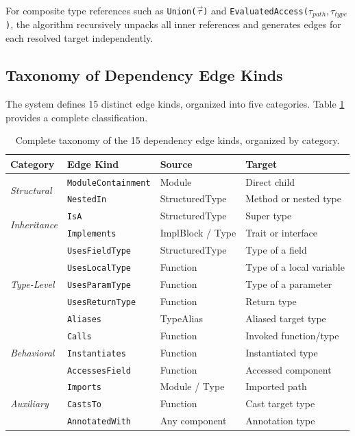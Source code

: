 For composite type references such as \texttt{Union($\vec{\tau}$)} and \texttt{EvaluatedAccess($\tau_{path}, \tau_{type}$)}, the algorithm recursively unpacks all inner references and generates edges for each resolved target independently.

\subsection{Taxonomy of Dependency Edge Kinds}

The system defines 15 distinct edge kinds, organized into five categories. Table \ref{tab:edge_taxonomy} provides a complete classification.

\begin{table}[htpb]
  \centering
  \small
  \begin{tabular}{|l|l|l|l|}
    \hline
    \textbf{Category} & \textbf{Edge Kind} & \textbf{Source} & \textbf{Target} \\ \hline
    \multirow{2}{*}{\textit{Structural}} & \texttt{ModuleContainment} & Module & Direct child \\ \cline{2-4}
    & \texttt{NestedIn} & StructuredType & Method or nested type \\ \hline

    \multirow{2}{*}{\textit{Inheritance}} & \texttt{IsA} & StructuredType & Super type \\ \cline{2-4}
    & \texttt{Implements} & ImplBlock / Type & Trait or interface \\ \hline

    \multirow{5}{*}{\textit{Type-Level}} & \texttt{UsesFieldType} & StructuredType & Type of a field \\ \cline{2-4}
    & \texttt{UsesLocalType} & Function & Type of a local variable \\ \cline{2-4}
    & \texttt{UsesParamType} & Function & Type of a parameter \\ \cline{2-4}
    & \texttt{UsesReturnType} & Function & Return type \\ \cline{2-4}
    & \texttt{Aliases} & TypeAlias & Aliased target type \\ \hline

    \multirow{3}{*}{\textit{Behavioral}} & \texttt{Calls} & Function & Invoked function/type \\ \cline{2-4}
    & \texttt{Instantiates} & Function & Instantiated type \\ \cline{2-4}
    & \texttt{AccessesField} & Function & Accessed component \\ \hline

    \multirow{3}{*}{\textit{Auxiliary}} & \texttt{Imports} & Module / Type & Imported path \\ \cline{2-4}
    & \texttt{CastsTo} & Function & Cast target type \\ \cline{2-4}
    & \texttt{AnnotatedWith} & Any component & Annotation type \\ \hline
  \end{tabular}
  \caption{Complete taxonomy of the 15 dependency edge kinds, organized by category.}
  \label{tab:edge_taxonomy}
\end{table}

